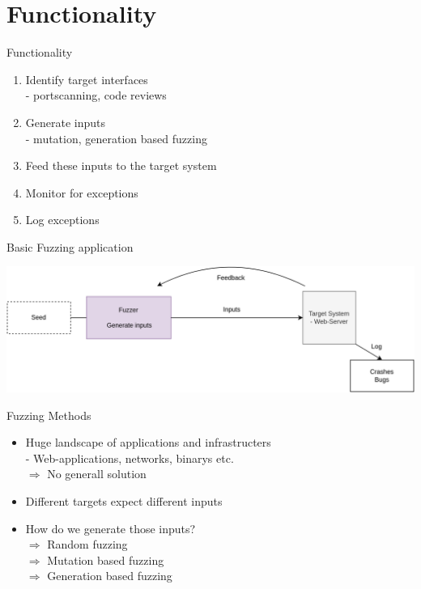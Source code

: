 \documentclass{beamer}
\begin{document}
\section{Functionality}
\begin{frame}{Functionality}
\begin{enumerate}
 \item Identify target interfaces\\
 - portscanning, code reviews
 \item Generate inputs\\
 - mutation, generation based fuzzing
 \item Feed these inputs to the target system
 \item Monitor for exceptions
 \item Log exceptions
\end{enumerate}

\end{frame}
\begin{frame}{Basic Fuzzing application}
\begin{center}
  \includegraphics[scale=0.15]{basicfuzz.png}
\end{center}
\end{frame}
\begin{frame}{Fuzzing Methods}
 \begin{itemize}
  \item Huge landscape of applications and infrastructers\\
  - Web-applications, networks, binarys etc.\\
  $\Rightarrow$ No generall solution
  \item Different targets expect different inputs
  \item How do we generate those inputs?\\
  $\Rightarrow$ Random fuzzing\\
  $\Rightarrow$ Mutation based fuzzing\\
  $\Rightarrow$ Generation based fuzzing
 \end{itemize}

\end{frame}
\end{document}
